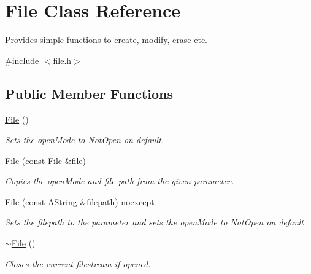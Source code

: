 \hypertarget{class_file}{}\section{File Class Reference}
\label{class_file}


Provides simple functions to create, modify, erase etc.  




{\ttfamily \#include $<$file.\+h$>$}

\subsection*{Public Member Functions}
\begin{DoxyCompactItemize}
\item 
\mbox{\label{class_file_ae039af5807fc385f41b60644725d15d0}} 
\mbox{\hyperlink{class_file_ae039af5807fc385f41b60644725d15d0}{File}} ()
\begin{DoxyCompactList}\small\item\em Sets the open\+Mode to Not\+Open on default. \end{DoxyCompactList}\item 
\mbox{\hyperlink{class_file_a59bf1e7bb0c6b8dd83dccef6b942a0f9}{File}} (const \mbox{\hyperlink{class_file}{File}} \&file)
\begin{DoxyCompactList}\small\item\em Copies the open\+Mode and file path from the given parameter. \end{DoxyCompactList}\item 
\mbox{\hyperlink{class_file_a2cc4f22d64e80a380dbd04141b772080}{File}} (const \mbox{\hyperlink{class_a_string}{A\+String}} \&filepath) noexcept
\begin{DoxyCompactList}\small\item\em Sets the filepath to the parameter and sets the open\+Mode to Not\+Open on default. \end{DoxyCompactList}\item 
\mbox{\label{class_file_ac704ebdf5f57d7a1c5ddf409d797fb69}} 
\mbox{\hyperlink{class_file_ac704ebdf5f57d7a1c5ddf409d797fb69}{$\sim$\+File}} ()
\begin{DoxyCompactList}\small\item\em Closes the current filestream if opened. \end{DoxyCompactList}\item 

\end{DoxyCompactItemize}

